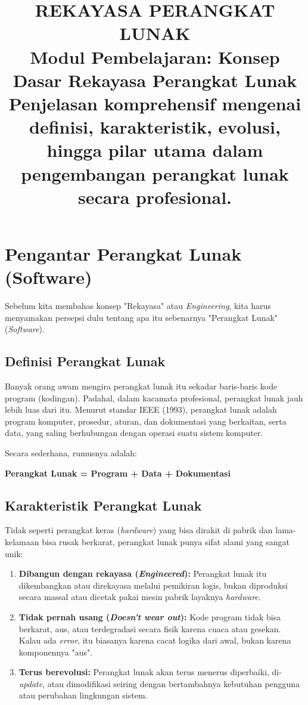 \documentclass[12pt,a4paper]{article}
\title{
  {\LARGE\bfseries REKAYASA PERANGKAT LUNAK}\\[0.5em]
  {\large Modul Pembelajaran: Konsep Dasar Rekayasa Perangkat Lunak}\\[0.8em]
  {\normalsize Penjelasan komprehensif mengenai definisi, karakteristik, evolusi, hingga pilar utama dalam pengembangan perangkat lunak secara profesional.}
}
\author{}
\date{}
\begin{document}
\maketitle
\thispagestyle{fancy}
\tableofcontents
\newpage


\section{Pengantar Perangkat Lunak (Software)}

Sebelum kita membahas konsep "Rekayasa" atau \textit{Engineering}, kita harus menyamakan persepsi dulu tentang apa itu sebenarnya "Perangkat Lunak" (\textit{Software}).

\subsection{Definisi Perangkat Lunak}
Banyak orang awam mengira perangkat lunak itu sekadar baris-baris kode program (kodingan). Padahal, dalam kacamata profesional, perangkat lunak jauh lebih luas dari itu. 
Menurut standar IEEE (1993), perangkat lunak adalah program komputer, prosedur, aturan, dan dokumentasi yang berkaitan, serta data, yang saling berhubungan dengan operasi suatu sistem komputer.

Secara sederhana, rumusnya adalah:
\begin{center}
    \textbf{Perangkat Lunak = Program + Data + Dokumentasi}
\end{center}

\subsection{Karakteristik Perangkat Lunak}
Tidak seperti perangkat keras (\textit{hardware}) yang bisa dirakit di pabrik dan lama-kelamaan bisa rusak berkarat, perangkat lunak punya sifat alami yang sangat unik:
\begin{enumerate}
    \item \textbf{Dibangun dengan rekayasa (\textit{Engineered}):} Perangkat lunak itu dikembangkan atau direkayasa melalui pemikiran logis, bukan diproduksi secara massal atau dicetak pakai mesin pabrik layaknya \textit{hardware}.
    \item \textbf{Tidak pernah usang (\textit{Doesn't wear out}):} Kode program tidak bisa berkarat, aus, atau terdegradasi secara fisik karena cuaca atau gesekan. Kalau ada \textit{error}, itu biasanya karena cacat logika dari awal, bukan karena komponennya "aus".
    \item \textbf{Terus berevolusi:} Perangkat lunak akan terus menerus diperbaiki, di-\textit{update}, atau dimodifikasi seiring dengan bertambahnya kebutuhan pengguna atau perubahan lingkungan sistem.
\end{enumerate}
\end{document}
